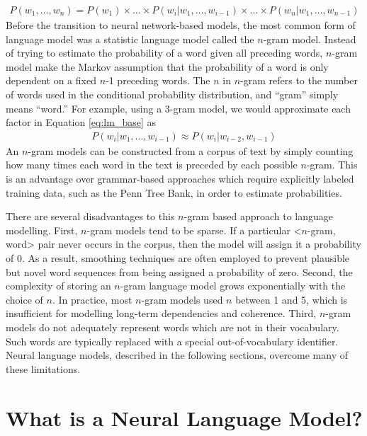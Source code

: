 \begin{align}
    \label{eq:lm_base}
    P(w_1, \ldots, w_n) = P(w_1) \times \ldots \times P(w_i | w_1, \ldots, w_{i-1}) \times \ldots \times P(w_n | w_1, \ldots, w_{n-1})
\end{align}
Before the transition to neural network-based models, the most common form of language model was a statistic language model called the $n$-gram model.
Instead of trying to estimate the probability of a word given all preceding words, $n$-gram model make the Markov assumption that the probability of a word is only dependent on a fixed $n$-1 preceding words. The $n$ in $n$-gram refers to the number of words used in the conditional probability distribution, and ``gram'' simply means ``word.''
For example, using a 3-gram model, we would approximate each factor in Equation \ref{eq:lm_base} as
\begin{align}
   P(w_i | w_1, \ldots, w_{i-1}) \approx P(w_i | w_{i-2}, w_{i-1})
\end{align}
An $n$-gram models can be constructed from a corpus of text by simply counting how many times each word in the text is preceded by each possible $n$-gram.
This is an advantage over grammar-based approaches which require explicitly labeled training data, such as the Penn Tree Bank, in order to estimate probabilities.

There are several disadvantages to this $n$-gram based approach to language modelling.
First, $n$-gram models tend to be sparse.
If a particular <$n$-gram, word> pair never occurs in the corpus, then the model will assign it a probability of 0.
As a result, smoothing techniques are often employed to prevent plausible but novel word sequences from being assigned a probability of zero.
Second, the complexity of storing an $n$-gram language model grows exponentially with the choice of $n$.
In practice, most $n$-gram models used $n$ between 1 and 5, which is insufficient for modelling long-term dependencies and coherence.
Third, $n$-gram models do not adequately represent words which are not in their vocabulary.
Such words are typically replaced with a special out-of-vocabulary identifier.
Neural language models, described in the following sections, overcome many of these limitations.


\section{What is a Neural Language Model?}
\label{section:what_is_a_nlm}

